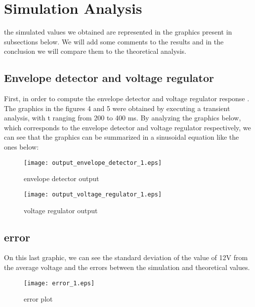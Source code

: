 \section{Simulation Analysis}
\label{sec:simulation}
the simulated values we obtained are represented in the graphics present in subsections below. We will add some comments to the results and in the conclusion we will compare them to the theoretical analysis.


\subsection{Envelope detector and voltage regulator }
First, in order to compute the envelope detector and voltage regulator response . The graphics in the figures 4 and 5 were obtained by executing a transient analysis, with t ranging from 200 to 400 ms.
By analyzing the graphics below, which corresponds to the envelope detector and voltage regulator respectively, we can see that the graphics can be summarized in a sinusoidal equation like the ones below:
\begin{figure}[h!] \centering
	\texttt{[image: output\_envelope\_detector\_1.eps]}
	\caption{envelope detector output}
	\label{fig:rc1}
\end{figure}
 

\begin{figure}[H] \centering
	\texttt{[image: output\_voltage\_regulator\_1.eps]}
	\caption{voltage regulator output}
	\label{fig:rc1}
\end{figure}


\subsection{error}
On this last graphic, we can see the standard deviation of the value of 12V from the average voltage and the errors between the simulation and theoretical values.
\begin{figure}[H] \centering
\texttt{[image: error\_1.eps]}
\caption{error plot}
\label{fig:rc1}
\end{figure}



